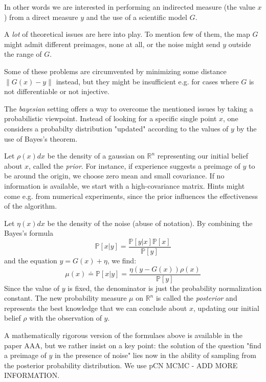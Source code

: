 \documentclass[6pt]{article}
\newcommand{\norm}[1]{\left\lVert#1\right\rVert}
\begin{document}
In other words we are interested in performing an indirected measure
(the value $x$) from a direct measure $y$ and the use of a scientific
model $G$.

A \emph{lot} of theoretical issues are here into play. To mention
few of them, the map $G$ might admit different preimages, none at all,
or the noise might send $y$ outside the range of $G$.

Some of these problems are circumvented by minimizing some distance
$\norm{G(x) - y}$ instead, but they might be
insufficient e.g. for cases where $G$ is not differentiable or not injective.

The \emph{bayesian} setting offers a way to overcome the mentioned issues
by taking a probabilistic viewpoint. Instead of looking for a specific
single point $x$, one considers a probabilty distribution "updated"
 according to the values of $y$ by the use of Bayes's theorem.

Let $\rho(x)dx$ be the density of a gaussian 
on $\mathbb{R}^n$ representing our initial belief
about $x$, called the \emph{prior}. 
For instance, if experience suggests a preimage of $y$ 
to be around the origin, we choose zero mean and small covariance.
If no information is available, we start with a high-covariance matrix.
Hints might come e.g. from numerical experiments, since
the prior influences the effectiveness of the algorithm.

Let $\eta(x)dx$ be the density of the noise (abuse of notation).
By combining the Bayes's formula
\begin{equation}
\mathbb{P}[x | y] = \frac{ \mathbb{P}[y | x] \mathbb{P}[x]} {\mathbb{P}[y]}
\end{equation}
and the equation $y = G(x) + \eta$, we find:
\begin{equation}
\mu (x) \doteq \mathbb{P}[x|y] = \frac{ \eta(y - G(x)) \rho(x)} {\mathbb{P}[y]}
\end{equation}
Since the value of $y$ is fixed, the denominator is just
the probability normalization constant. The new probability measure
$\mu$ on $\mathbb{R}^n$ is called the \emph{posterior} and represents
the best knowledge that we can conclude about $x$, updating our initial
belief $\rho$ with the observation of $y$.

A mathematically rigorous version of the formulaes above is available in
the paper AAA, but we rather insist on a key point:
the solution of the question "find a preimage of $y$ in the presence of noise"
lies now in the ability
of sampling from the posterior probability distribution.
We use pCN MCMC - ADD MORE INFORMATION.
\end{document}
